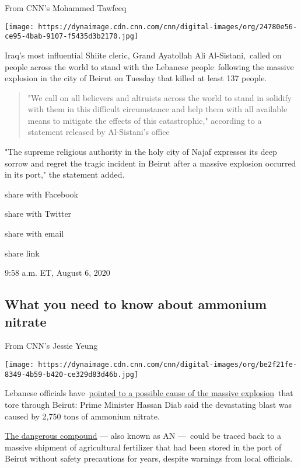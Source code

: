 From CNN's Mohammed Tawfeeq

\texttt{[image: https://dynaimage.cdn.cnn.com/cnn/digital-images/org/24780e56-ce95-4bab-9107-f5435d3b2170.jpg]}

Iraq's most influential Shiite cleric, Grand Ayatollah Ali
Al-Sistani,~called on people across the world to stand with the Lebanese
people~following the massive explosion in the city of Beirut on Tuesday
that killed at least 137 people.~

\begin{quote}
"We call on all believers and altruists across the world to stand in
solidify with them in this difficult circumstance and help them with all
available means to mitigate the effects of this catastrophic," according
to a statement released by Al-Sistani's office~
\end{quote}

"The supreme religious authority in the holy city of Najaf expresses its
deep sorrow and regret the tragic incident in Beirut after a massive
explosion occurred in its port," the statement added.

share with Facebook

share with Twitter

share with email

share link

9:58 a.m. ET, August 6, 2020

\hypertarget{what-you-need-to-know-about-ammonium-nitrate}{%
\subsection{What you need to know about ammonium
nitrate}\label{what-you-need-to-know-about-ammonium-nitrate}}

From CNN's Jessie Yeung

\texttt{[image: https://dynaimage.cdn.cnn.com/cnn/digital-images/org/be2f21fe-8349-4b59-b420-ce329d83d46b.jpg]}

Lebanese officials
have~\href{https://www.cnn.com/2020/08/05/europe/lebanon-russian-ship-blast-intl/index.html}{pointed
to a possible cause of the massive explosion}~that tore through Beirut:
Prime Minister Hassan Diab said the devastating blast was caused by
2,750 tons of ammonium nitrate.~

\href{https://www.cnn.com/2020/08/05/middleeast/ammonium-nitrate-beirut-blast-intl/index.html}{The
dangerous compound} --- also known as AN ---~could be traced back to a
massive shipment of agricultural fertilizer that had been stored in the
port of Beirut without safety precautions for years, despite warnings
from local officials.~

